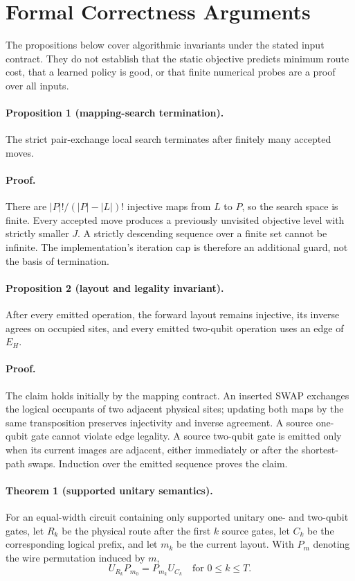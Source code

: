 \documentclass[a4paper,11pt,twocolumn]{article}
\begin{document}
\section{Formal Correctness Arguments}
The propositions below cover algorithmic invariants under the stated input
contract. They do not establish that the static objective predicts minimum
route cost, that a learned policy is good, or that finite numerical probes are
a proof over all inputs.

\paragraph{Proposition 1 (mapping-search termination).}
The strict pair-exchange local search terminates after finitely many accepted
moves.

\paragraph{Proof.}
There are $|P|!/(|P|-|L|)!$ injective maps from $L$ to $P$, so the search space
is finite. Every accepted move produces a previously unvisited objective level
with strictly smaller $J$. A strictly descending sequence over a finite set
cannot be infinite. The implementation's iteration cap is therefore an
additional guard, not the basis of termination.

\paragraph{Proposition 2 (layout and legality invariant).}
After every emitted operation, the forward layout remains injective, its
inverse agrees on occupied sites, and every emitted two-qubit operation uses an
edge of $E_H$.

\paragraph{Proof.}
The claim holds initially by the mapping contract. An inserted SWAP exchanges
the logical occupants of two adjacent physical sites; updating both maps by
the same transposition preserves injectivity and inverse agreement. A source
one-qubit gate cannot violate edge legality. A source two-qubit gate is emitted
only when its current images are adjacent, either immediately or after the
shortest-path swaps. Induction over the emitted sequence proves the claim.

\paragraph{Theorem 1 (supported unitary semantics).}
For an equal-width circuit containing only supported unitary one- and
two-qubit gates, let $R_k$ be the physical route after the first $k$
source gates, let $C_k$ be the corresponding logical prefix, and let $m_k$
be the current layout. With $P_m$ denoting the wire
permutation induced by $m$,
\begin{equation}
 U_{R_k}P_{m_0}=P_{m_k}U_{C_k}
 \quad\text{for }0\leq k\leq T .
 \label{eq:route-invariant}
\end{equation}
\end{document}
